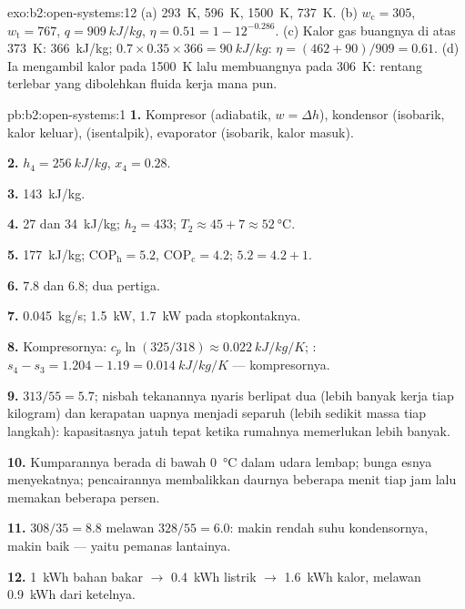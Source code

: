 \begin{solution}{exo:b2:open-systems:12}
(a) \qty{293}{K}, \qty{596}{K}, \qty{1500}{K}, \qty{737}{K}. (b) $w_{\text{c}} = 305$,
$w_{\text{t}} = 767$, $q = \qty{909}{kJ/kg}$, $\eta = 0.51 = 1 - 12^{-0.286}$. (c)
Kalor gas buangnya di atas \qty{373}{K}: \qty{366}{kJ/kg}; $0.7 \times 0.35 \times 366 =
\qty{90}{kJ/kg}$: $\eta = (462 + 90)/909 = 0.61$. (d) Ia mengambil kalor pada
\qty{1500}{K} lalu membuangnya pada \qty{306}{K}: rentang terlebar yang dibolehkan fluida
kerja mana pun.
\end{solution}

\begin{solution}{pb:b2:open-systems:1}
\textbf{1.} Kompresor (adiabatik, $w = \Delta h$), kondensor (isobarik, kalor
keluar),  (isentalpik), evaporator (isobarik, kalor masuk).

\textbf{2.} $h_4 = \qty{256}{kJ/kg}$, $x_4 = 0.28$.

\textbf{3.} \qty{143}{kJ/kg}.

\textbf{4.} \qty{27}{} dan \qty{34}{kJ/kg}; $h_2 = 433$; $T_2 \approx 45 + 7 \approx
\qty{52}{\celsius}$.

\textbf{5.} \qty{177}{kJ/kg}; $\mathrm{COP}_{\text{h}} = 5.2$, $\mathrm{COP}_{\text{c}} = 4.2$;
$5.2 = 4.2 + 1$.

\textbf{6.} $7.8$ dan $6.8$; dua pertiga.

\textbf{7.} \qty{0.045}{kg/s}; \qty{1.5}{kW}, \qty{1.7}{kW} pada stopkontaknya.

\textbf{8.} Kompresornya: $c_p\ln(325/318) \approx \qty{0.022}{kJ/kg/K}$;
: $s_4 - s_3 = 1.204 - 1.19 = \qty{0.014}{kJ/kg/K}$ --- kompresornya.

\textbf{9.} $313/55 = 5.7$; nisbah tekanannya nyaris berlipat dua (lebih banyak kerja
tiap kilogram) dan kerapatan uapnya menjadi separuh (lebih sedikit massa tiap langkah):
kapasitasnya jatuh tepat ketika rumahnya memerlukan lebih banyak.

\textbf{10.} Kumparannya berada di bawah \qty{0}{\celsius} dalam udara lembap; bunga esnya
menyekatnya; pencairannya membalikkan daurnya beberapa menit tiap jam lalu
memakan beberapa persen.

\textbf{11.} $308/35 = 8.8$ melawan $328/55 = 6.0$: makin rendah suhu
kondensornya, makin baik --- yaitu pemanas lantainya.

\textbf{12.} \qty{1}{kWh} bahan bakar $\to$ \qty{0.4}{kWh} listrik $\to$
\qty{1.6}{kWh} kalor, melawan \qty{0.9}{kWh} dari ketelnya.


\end{solution}
